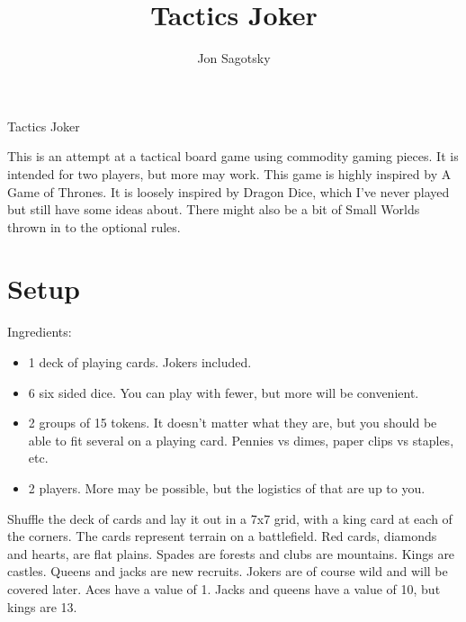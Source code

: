 \documentclass{article}
\title{Tactics Joker}
\author{Jon Sagotsky}
\begin{document}
\maketitle
%
%
\def \maxarmy {6 }            %
\def \reinforcements {15 }    %
\def \recruitroll {6 }        %


Tactics Joker

This is an attempt at a tactical board game using commodity gaming pieces.  It is intended for two players, but more may work.  This game is highly inspired by A Game of Thrones.  It is loosely inspired by Dragon Dice, which I've never played but still have some ideas about.  There might also be a bit of Small Worlds thrown in to the optional rules.


\section{Setup}

Ingredients: 
\begin{itemize}
  \item 1 deck of playing cards.  Jokers included.
  \item 6 six sided dice.  You can play with fewer, but more will be convenient.
  \item 2 groups of \reinforcements tokens.  It doesn't matter what they are, but you should be able to fit several on a playing card.  Pennies vs dimes, paper clips vs staples, etc.
  \item 2 players.  More may be possible, but the logistics of that are up to you.
\end{itemize}

Shuffle the deck of cards and lay it out in a 7x7 grid, with a king card at each of the corners.  The cards represent terrain on a battlefield.  Red cards, diamonds and hearts, are flat plains.  Spades are forests and clubs are mountains.  Kings are castles.  Queens and jacks are new recruits.  Jokers are of course wild and will be covered later.  Aces have a value of 1.  Jacks and queens have a value of 10, but kings are 13.
\end{document}
